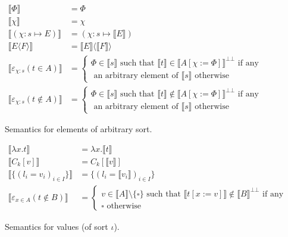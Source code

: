 \begin{figure}
  \begin{align*}
    \llbracket \Phi \rrbracket &= \Phi\\
    \llbracket \chi \rrbracket &= \chi\\
    \llbracket (\chi:s \mapsto E) \rrbracket
      &= (\chi:s \mapsto \llbracket E \rrbracket)\\
    \llbracket E\langle F \rangle \rrbracket
      &= \llbracket E \rrbracket \langle \llbracket F \rrbracket \rangle\\
    \llbracket \varepsilon_{\chi:s}(t \in A) \rrbracket
      &= \begin{cases}
           \Phi \in \llbracket s \rrbracket \text{ such that }
             \llbracket t \rrbracket \in \llbracket A[\chi := \Phi]
             \rrbracket^{\bot\bot} \text{ if any}\\
           \text{ an arbitrary element of } \llbracket s \rrbracket
             \text { otherwise}
         \end{cases}\\
    \llbracket \varepsilon_{\chi:s}(t \notin A) \rrbracket
      &= \begin{cases}
           \Phi \in \llbracket s \rrbracket \text{ such that }
             \llbracket t \rrbracket \notin \llbracket A[\chi := \Phi]
             \rrbracket^{\bot\bot} \text{ if any}\\
           \text{ an arbitrary element of } \llbracket s \rrbracket
             \text { otherwise}
         \end{cases}
  \end{align*}
  \caption{Semantics for elements of arbitrary sort.}\label{semany}
\end{figure}

\begin{figure}
  \begin{align*}
    \llbracket \lambda x.t \rrbracket
      &= \lambda x.\llbracket t \rrbracket\\
    \llbracket C_k[v] \rrbracket
      &= C_k[\llbracket v \rrbracket]\\
    \llbracket \{(l_i=v_i)_{i \in I}\} \rrbracket
      &= \{(l_i = \llbracket v_i \rrbracket)_{i \in I}\}\\
    \llbracket \varepsilon_{x \in A}(t \notin B) \rrbracket
      &= \begin{cases}
           v \in \llbracket A \rrbracket \setminus \{\square\}
             \text{ such that } \llbracket t[x := v] \rrbracket \notin
             \llbracket B \rrbracket^{\bot\bot} \text{ if any}\\
           \square \text { otherwise}
         \end{cases}
  \end{align*}
  \caption{Semantics for values (of sort $\iota$).}
  \label{semiota}
\end{figure}

